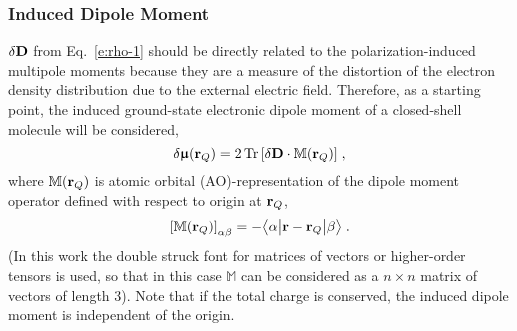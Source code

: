 \documentclass[aip,jcp,preprint,amsmath,amssymb,floatfix]{revtex4-1}
\newcommand{\tbraket}[3]{\ensuremath{\bigl\langle {#1} \bigl\lvert {#2} \bigl\lvert {#3} \bigr\rangle}}
\newcommand{\BM}[1]{\bm{#1}}
\DeclareMathOperator{\Tr}{Tr}
\begin{document}
\subsubsection{Induced Dipole Moment}

$\delta {\bf D}$ from Eq.~\eqref{e:rho-1} should 
be directly related to the
polarization\hyp{}induced multipole moments because they are
a measure of the distortion of the electron density distribution due to the external electric
field. Therefore, as a starting point, the induced 
ground\hyp{}state electronic dipole moment of a closed\hyp{}shell molecule
will be considered,
%
\begin{equation} \label{e:dmu-exact}
 \delta {\BM{\upmu}}({\bf r}_Q) = 
     2 \Tr{ 
         \left[ 
              \delta {\bf D} \cdot {\mathbb{M}({\bf r}_Q)}
         \right] } \;,
\end{equation}
%
where ${\mathbb{M}({\bf r}_Q)}$ is atomic orbital (AO)\hyp{}representation
of the dipole moment operator defined with respect to origin at ${\bf r}_Q$,
%
\begin{equation}\label{e:m}
 \left[ {\mathbb{M}({\bf r}_Q)} \right]_{\alpha\beta} = -\tbraket{\alpha}{{\bf r} - {\bf r}_Q}{\beta} \;.
\end{equation}
%
(In this work the double struck font for matrices of vectors or higher\hyp{}order tensors is used, so that
in this case ${\mathbb{M}}$ can be considered as a $n \times n$ matrix of vectors of length 3).
Note that if the total charge is conserved, the induced dipole moment is independent of the origin.
\end{document}
